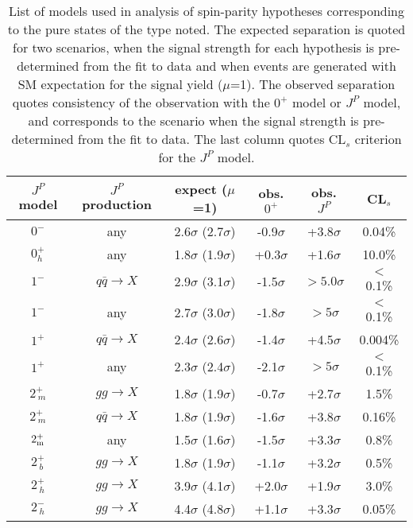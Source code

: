 
\begin{table}[h]
\centering
\begin{tabular}{|c|c|c|c|c|c|} 
\hline%
 $J^P$ model & $J^P$ production & expect ($\mu$=1) &  obs. $0^+$  & obs. $J^P$ & CL$_s$  \\
\hline%
$0^-$     & any         &  2.6$\sigma$ (2.7$\sigma$)  & -0.9$\sigma$ & +3.8$\sigma$  &  0.04\%  \\
$0_h^+$  & any         &  1.8$\sigma$ (1.9$\sigma$)  & +0.3$\sigma$ &  +1.6$\sigma$  &  10.0\% \\
$1^-$     & $q \bar q\to X$         &  2.9$\sigma$ (3.1$\sigma$)  & -1.5$\sigma$ &  $>5.0\sigma$  &  $<$0.1\% \\
$1^-$   & any       &  2.7$\sigma$ (3.0$\sigma$)  & -1.8$\sigma$ &  $>5\sigma$    &  $<$0.1\% \\
 $1^+$    & $q \bar q\to X$          &  2.4$\sigma$ (2.6$\sigma$)  & -1.4$\sigma$  & +4.5$\sigma$  &  0.004\% \\
 $1^+$   & any           &  2.3$\sigma$ (2.4$\sigma$)  & -2.1$\sigma$ &  $>5\sigma$    &  $<$0.1\% \\
$2_{~m}^+$   & $gg \to X$  &  1.8$\sigma$ (1.9$\sigma$)  & -0.7$\sigma$ & +2.7$\sigma$  &  1.5\% \\
$2_{~m}^+$  & $q \bar q\to X$ &  1.8$\sigma$ (1.9$\sigma$)  & -1.6$\sigma$ & +3.8$\sigma$  &  0.16\% \\
 $2_{\rm m}^+$  & any     &  1.5$\sigma$ (1.6$\sigma$)  & -1.5$\sigma$ & +3.3$\sigma$  &  0.8\% \\
$2_{~b}^+$      & $gg \to X$     &  1.8$\sigma$ (1.9$\sigma$)  & -1.1$\sigma$ & +3.2$\sigma$  &  0.5\% \\
$2_{~h}^+$    & $gg \to X$       &  3.9$\sigma$ (4.1$\sigma$)  & +2.0$\sigma$ & +1.9$\sigma$  &  3.0\% \\
$2_{~h}^-$     & $gg \to X$      &  4.4$\sigma$ (4.8$\sigma$)  & +1.1$\sigma$ & +3.3$\sigma$  &  0.05\% \\
\hline%
\end{tabular}
\caption{ List of models used in analysis of spin-parity hypotheses
  corresponding to the pure states of the type noted.  The expected
  separation is quoted for two scenarios, when the signal strength for
  each hypothesis is pre-determined from the fit to data and when
  events are generated with SM expectation for the signal yield
  ($\mu$=1).  The observed separation quotes consistency of the
  observation with the $0^+$ model or $J^P$ model, and corresponds to
  the scenario when the signal strength is pre-determined from the fit
  to data.  The last column quotes CL$_s$ criterion for the $J^P$
  model.  }
\label{table:HZZ4lhypothTests}
\end{table}

